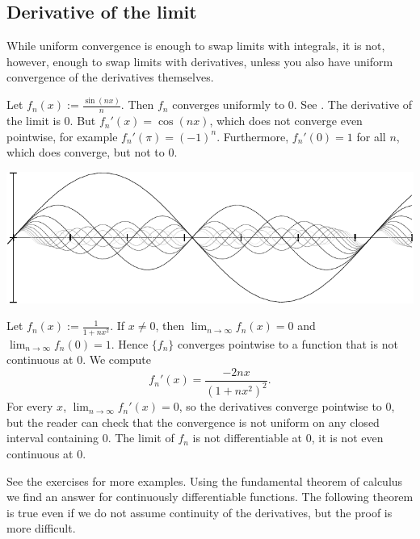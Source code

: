 \subsection{Derivative of the limit}

While uniform convergence is enough to swap limits with integrals, it is not,
however, enough to swap limits with derivatives, unless you also have
uniform convergence of the derivatives themselves.

\begin{example}
Let $f_n(x) := \frac{\sin(nx)}{n}$.  Then $f_n$ converges uniformly to
0.  See .
The derivative of the limit is 0.  But $f_n'(x) = \cos(nx)$, which
does not converge even pointwise, for
example $f_n'(\pi) = {(-1)}^n$.  Furthermore,
$f_n'(0) = 1$ for all $n$, which does converge, but not to $0$.
\begin{myfigureht}
\includegraphics{figures/conv1nsinxn}
\caption{Graphs of $\frac{\sin(nx)}{n}$ for
$n=1,2,\ldots,10$, with higher $n$ in lighter gray.%
\label{fig:conv1nsinxn}}
\end{myfigureht}
\end{example}

\begin{example} \label{exercise:badconvergenceder}
Let $f_n(x) := \frac{1}{1+nx^2}$.
If $x \not= 0$, then $\lim_{n \to \infty} f_n(x) = 0$
and $\lim_{n \to \infty} f_n(0) = 1$.
Hence $\{ f_n \}$ converges pointwise to a function that is not continuous
at $0$.
We compute
\begin{equation*}
f_n'(x) %
= \frac{-2 n x}{(1+ n x^2)^2} .
\end{equation*}
For every $x$, $\lim_{n\to\infty} f_n'(x) = 0$, so the derivatives
converge pointwise to 0,
but the reader can check that the convergence is not uniform on any closed
interval containing $0$.
The limit of $f_n$ is not differentiable at $0$, it is not even
continuous at $0$.
\end{example}

See the exercises for more examples.  Using 
the fundamental theorem of calculus we find an answer for continuously
differentiable functions.  The following theorem is true even if 
we do not assume continuity of the derivatives, but the proof is more
difficult.

